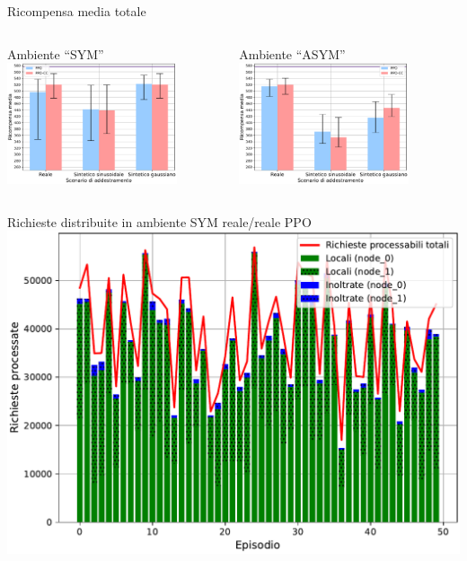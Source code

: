 \documentclass[]{beamer}
\begin{document}
\begin{frame}{Ricompensa media totale}
    \begin{columns}
        \begin{column}{.5\textwidth}
            \centering
            \small Ambiente ``SYM''
            \includegraphics[width=5cm]{assets/slides/eval_ASYM_summary_reward.pdf}
        \end{column}
        \begin{column}{.5\textwidth}
            \centering
            \small Ambiente ``ASYM''
            \includegraphics[width=5cm]{assets/slides/eval_SYM_summary_reward.pdf}
        \end{column}
    \end{columns}
\end{frame}

\begin{frame}{Richieste distribuite in ambiente SYM reale/reale PPO}
    \centering
    \includegraphics[width=.95\linewidth]{assets/5/results/real_real_ppo_proc_reqs_abs.pdf}
\end{frame}
\end{document}
